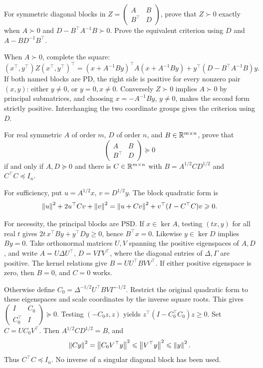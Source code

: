 \begin{problem}\label{ex:09:positive-schur}
For symmetric diagonal blocks in
\(Z=\begin{pmatrix}A&B\\B^\top&D\end{pmatrix}\), prove that \(Z\succ0\)
exactly when \(A\succ0\) and \(D-B^\top A^{-1}B\succ0\).
Prove the equivalent criterion using \(D\) and \(A-BD^{-1}B^\top\).
\end{problem}
\begin{solution}
When \(A\succ0\), complete the square:
\[
 (x^\top,y^\top)Z(x^\top,y^\top)^\top
 =(x+A^{-1}By)^\top A(x+A^{-1}By)
   +y^\top(D-B^\top A^{-1}B)y.
\]
If both named blocks are PD, the right side is positive for every
nonzero pair \((x,y)\): either \(y\ne0\), or \(y=0,x\ne0\).
Conversely \(Z\succ0\) implies \(A\succ0\) by principal submatrices,
and choosing \(x=-A^{-1}By\), \(y\ne0\), makes the second form strictly
positive. Interchanging the two coordinate groups gives the criterion
using \(D\).
\end{solution}

\begin{problem}\label{ex:09:contractions}
For real symmetric \(A\) of order \(m\), \(D\) of order \(n\), and
\(B\in\mathbb R^{m\times n}\), prove that
\[
 \begin{pmatrix}A&B\\B^\top&D\end{pmatrix}\succeq0
\]
if and only if \(A,D\succeq0\) and there is \(C\in\mathbb R^{m\times n}\) with
\(B=A^{1/2}CD^{1/2}\) and \(C^\top C\preceq I_n\).
\end{problem}
\begin{solution}
For sufficiency, put \(u=A^{1/2}x\), \(v=D^{1/2}y\).
The block quadratic form is
\[
 \left\lVert u\right\rVert^2+2u^\top Cv+\left\lVert v\right\rVert^2
 =\left\lVert u+Cv\right\rVert^2+v^\top(I-C^\top C)v\geqslant0.
\]

For necessity, the principal blocks are PSD.
If \(x\in\ker A\), testing \((tx,y)\) for all real \(t\) gives
\(2t\,x^\top By+y^\top Dy\geqslant0\), hence \(B^\top x=0\).
Likewise \(y\in\ker D\) implies \(By=0\).
Take orthonormal matrices \(U,V\) spanning the positive eigenspaces of
\(A,D\), and write
\(A=U\Delta U^\top\), \(D=V\Gamma V^\top\), where the diagonal
entries of \(\Delta,\Gamma\) are positive.
The kernel relations give
\(B=UU^\top B VV^\top\).
If either positive eigenspace is zero, then \(B=0\), and \(C=0\) works.

Otherwise define
\(C_0=\Delta^{-1/2}U^\top BV\Gamma^{-1/2}\).
Restrict the original quadratic form to these eigenspaces and scale
coordinates by the inverse square roots. This gives
\(\begin{pmatrix}I&C_0\\C_0^\top&I\end{pmatrix}\succeq0\).
Testing \((-C_0z,z)\) yields
\(z^\top(I-C_0^\top C_0)z\geqslant0\).
Set \(C=UC_0V^\top\).
Then \(A^{1/2}CD^{1/2}=B\), and
\[
 \left\lVert Cy\right\rVert^2=\left\lVert C_0V^\top y\right\rVert^2
 \leqslant\left\lVert V^\top y\right\rVert^2\leqslant\left\lVert y\right\rVert^2.
\]
Thus \(C^\top C\preceq I_n\). No inverse of a singular diagonal block
has been used.
\end{solution}

